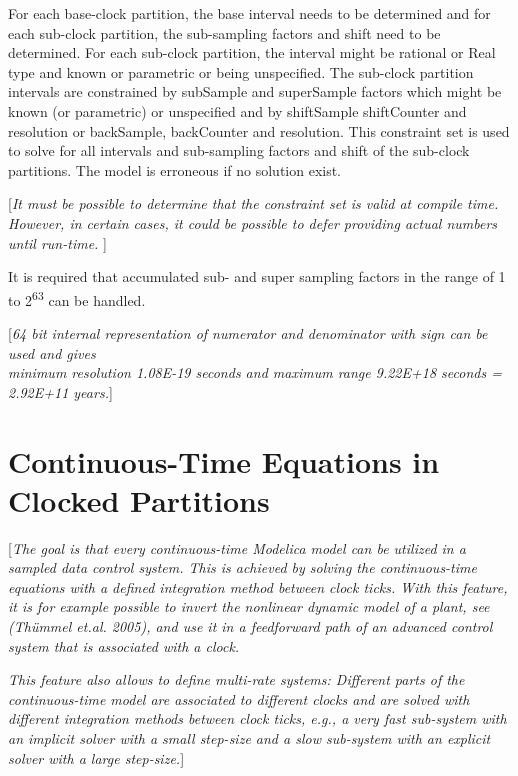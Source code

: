 \documentclass[10pt,a4paper]{report}
\def\doublelabel#1{\label{#1}\hypertarget{#1}{}}
\begin{document}
For each base-clock partition, the base interval needs to be determined
and for each sub-clock partition, the sub-sampling factors and shift
need to be determined. For each sub-clock partition, the interval might
be rational or Real type and known or parametric or being unspecified.
The sub-clock partition intervals are constrained by subSample and
superSample factors which might be known (or parametric) or unspecified
and by shiftSample shiftCounter and resolution or backSample,
backCounter and resolution. This constraint set is used to solve for all
intervals and sub-sampling factors and shift of the sub-clock
partitions. The model is erroneous if no solution exist.

{[}\emph{It must be possible to determine that the constraint set is
valid at compile time. However, in certain cases, it could be possible
to defer providing actual numbers until run-time.} {]}

It is required that accumulated sub- and super sampling factors in the
range of 1 to 2\textsuperscript{63} can be handled.

{[}\emph{64 bit internal representation of numerator and denominator
with sign can be used and gives\\
minimum resolution 1.08E-19 seconds and maximum range 9.22E+18 seconds =
2.92E+11 years.}{]}

\section{Continuous-Time Equations in Clocked Partitions}\doublelabel{continuous-time-equations-in-clocked-partitions}

{[}\emph{The goal is that every continuous-time Modelica model can be
utilized in a sampled data control system. This is achieved by solving
the continuous-time equations with a defined integration method between
clock ticks. With this feature, it is for example possible to invert the
nonlinear dynamic model of a plant, see (Thümmel et.al. 2005), and use
it in a feedforward path of an advanced control system that is
associated with a clock.}

\emph{This feature also allows to define multi-rate systems: Different
parts of the continuous-time model are associated to different clocks
and are solved with different integration methods between clock ticks,
e.g., a very fast sub-system with an implicit solver with a small
step-size and a slow sub-system with an explicit solver with a large
step-size.}{]}
\end{document}
